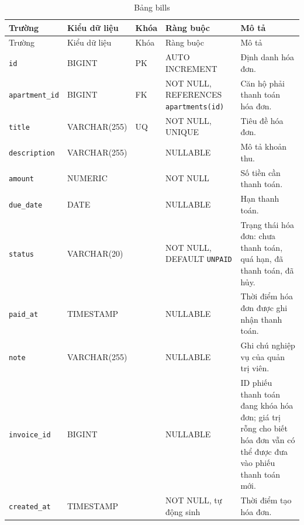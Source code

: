 ﻿\documentclass[12pt,a4paper]{report}
\begin{document}
\begin{longtable}{L{4.2cm} L{2.15cm} L{0.75cm} L{3.05cm} L{4.0cm}}
\caption{Bảng bills}\label{tab:db-bills}\\
\toprule
Trường & Kiểu dữ liệu & Khóa & Ràng buộc & Mô tả \\
\midrule
\endfirsthead
\toprule Trường & Kiểu dữ liệu & Khóa & Ràng buộc & Mô tả \\\midrule
\endhead
\texttt{id} & BIGINT & PK & AUTO INCREMENT & Định danh hóa đơn. \\
\texttt{apartment\_id} & BIGINT & FK & NOT NULL, REFERENCES \texttt{apartments(id)} & Căn hộ phải thanh toán hóa đơn. \\
\texttt{title} & VARCHAR(255) & UQ & NOT NULL, UNIQUE & Tiêu đề hóa đơn. \\
\texttt{description} & VARCHAR(255) & & NULLABLE & Mô tả khoản thu. \\
\texttt{amount} & NUMERIC & & NOT NULL & Số tiền cần thanh toán. \\
\texttt{due\_date} & DATE & & NULLABLE & Hạn thanh toán. \\
\texttt{status} & VARCHAR(20) & & NOT NULL, DEFAULT \texttt{UNPAID} & Trạng thái hóa đơn: chưa thanh toán, quá hạn, đã thanh toán, đã hủy. \\
\texttt{paid\_at} & TIMESTAMP & & NULLABLE & Thời điểm hóa đơn được ghi nhận thanh toán. \\
\texttt{note} & VARCHAR(255) & & NULLABLE & Ghi chú nghiệp vụ của quản trị viên. \\
\texttt{invoice\_id} & BIGINT & & NULLABLE & ID phiếu thanh toán đang khóa hóa đơn; giá trị rỗng cho biết hóa đơn vẫn có thể được đưa vào phiếu thanh toán mới. \\
\texttt{created\_at} & TIMESTAMP & & NOT NULL, tự động sinh & Thời điểm tạo hóa đơn. \\
\bottomrule
\end{longtable}
\end{document}
